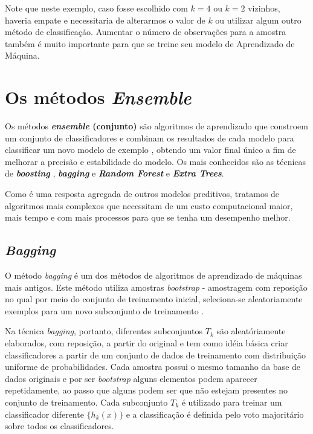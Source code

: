 \documentclass[
]{book}
\begin{document}
Note que neste exemplo, caso fosse escolhido com \(k=4\) ou \(k=2\) vizinhos, haveria empate e necessitaria de alterarmos o valor de \(k\) ou utilizar algum outro método de classificação. Aumentar o número de observações para a amostra também é muito importante para que se treine seu modelo de Aprendizado de Máquina.

\hypertarget{ptIII}{%
\chapter{\texorpdfstring{Os métodos \emph{Ensemble}}{Os métodos Ensemble}}\label{ptIII}}

Os métodos \textbf{\emph{ensemble} (conjunto)} são algoritmos de aprendizado que constroem um conjunto de classificadores e combinam os resultados de cada modelo para classificar um novo modelo de exemplo \citep{dietterich2000ensemble}, obtendo um valor final único a fim de melhorar a precisão e estabilidade do modelo. Os mais conhecidos são as técnicas de \textbf{\emph{boosting}} \citep{freund1996experiments}, \textbf{\emph{bagging}} \citep{breiman1996bagging} e \textbf{\emph{Random Forest}} \citep{breiman2001random, liaw2002classification} e \textbf{\emph{Extra Trees}}.

Como é uma resposta agregada de outros modelos preditivos, tratamos de algoritmos mais complexos que necessitam de um custo computacional maior, mais tempo e com mais processos para que se tenha um desempenho melhor.

\hypertarget{bagging}{%
\section{\texorpdfstring{\emph{Bagging}}{Bagging}}\label{bagging}}

O método \emph{bagging} \citep{breiman1996bagging} é um dos métodos de algoritmos de aprendizado de máquinas mais antigos. Este método utiliza amostras \emph{bootstrap} - amostragem com reposição no qual por meio do conjunto de treinamento inicial, seleciona-se aleatoriamente exemplos para um novo subconjunto de treinamento \citep{oshiro2013abordagem}.

Na técnica \emph{bagging}, portanto, diferentes subconjuntos \(T_k\) são aleatóriamente elaborados, com reposição, a partir do original e tem como idéia básica criar classificadores a partir de um conjunto de dados de treinamento com distribuição uniforme de probabilidades. Cada amostra possui o mesmo tamanho da base de dados originais e por ser \emph{bootstrap} alguns elementos podem aparecer repetidamente, ao passo que alguns podem ser que não estejam presentes no conjunto de treinamento. Cada subconjunto \(T_k\) é utilizado para treinar um classificador diferente \(\{h_k(x)\}\) e a classificação é definida pelo voto majoritário sobre todos os classificadores.
\end{document}

